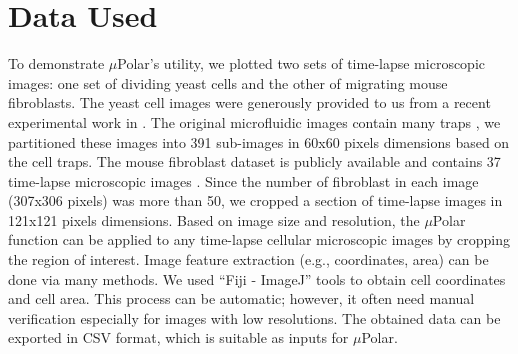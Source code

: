 \documentclass[conference]{IEEEtran}
\begin{document}

\section{Data Used}
 To demonstrate $\mu$Polar's utility, we plotted two sets of time-lapse microscopic images: one set of dividing yeast cells and the other of migrating mouse fibroblasts. The yeast  cell images were generously provided to us from a recent experimental work in  \cite{r13}.  The original microfluidic images contain many traps , we partitioned these images into 391 sub-images in 60x60 pixels dimensions based on the cell traps. The mouse fibroblast dataset is publicly available and contains 37 time-lapse microscopic images \cite{r20}. Since the number of fibroblast in each image (307x306 pixels) was more than 50, we cropped a section of time-lapse images in 121x121 pixels dimensions. Based on image size and resolution, the $\mu$Polar function can be applied to any time-lapse cellular microscopic images by cropping the region of interest. Image feature extraction (e.g., coordinates, area) can be done via many methods. We used ``Fiji - ImageJ'' tools to obtain cell coordinates and cell area. This process can be automatic; however, it often need manual verification especially for  images with low resolutions. The obtained data can be exported in CSV format, which is suitable as inputs for $\mu$Polar.  

\end{document}
